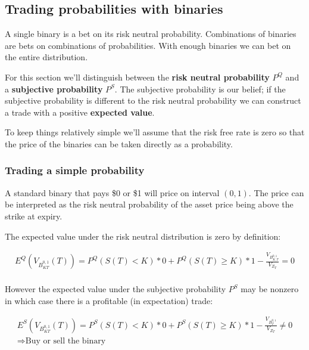 
\subsection{Trading probabilities with binaries}

A single binary is a bet on its risk neutral probability. Combinations of binaries are bets on combinations of probabilities. With enough binaries we can bet on the entire distribution.  

For this section we'll distinguish between the \textbf{risk neutral probability} $P^Q$ and a \textbf{subjective probability} $P^S$. The subjective probability is our belief; if the subjective probability is different to the risk neutral probability we can construct a trade with a positive \textbf{expected value}. 

To keep things relatively simple we'll assume that the risk free rate is zero so that the price of the binaries can be taken directly as a probability.

\subsubsection{Trading a simple probability}

A standard binary that pays \$0 or \$1 will price on interval $(0,1)$. The price can be interpreted as the risk neutral probability of the asset price being above the strike at expiry. 

The expected value under the risk neutral distribution is zero by definition:

\begin{eqnarray*}
E^Q(V_{B^{0,1}_{KT}}(T)) = P^Q(S(T)<K)*0 + P^Q(S(T)\geq K)*1-\frac{V_{B_{K,T}^{0,1}}}{V_{Z_T}} = 0\\
\end{eqnarray*}

However the expected value under the subjective probability $P^S$ may be nonzero in which case there is a profitable (in expectation) trade:

\begin{eqnarray*}
E^S(V_{B^{0,1}_{KT}}(T)) = P^S(S(T)<K)*0 + P^S(S(T)\geq K)*1-\frac{V_{B_T^{0,1}}}{V_{Z_T}} \neq 0\\
 \Rightarrow \mbox{Buy or sell the binary} 
\end{eqnarray*}

